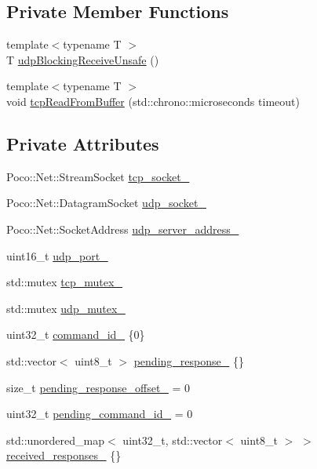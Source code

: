 \subsection*{Private Member Functions}
\begin{DoxyCompactItemize}
\item 
{\footnotesize template$<$typename T $>$ }\\T \hyperlink{classfranka_1_1Network_abe956fd11cd59309c93aebe15d433242}{udp\+Blocking\+Receive\+Unsafe} ()
\item 
{\footnotesize template$<$typename T $>$ }\\void \hyperlink{classfranka_1_1Network_a99a8575b86f0b4ddc206b67483cd65aa}{tcp\+Read\+From\+Buffer} (std\+::chrono\+::microseconds timeout)
\end{DoxyCompactItemize}
\subsection*{Private Attributes}
\begin{DoxyCompactItemize}
\item 
Poco\+::\+Net\+::\+Stream\+Socket \hyperlink{classfranka_1_1Network_a2c26c04f9ccb9792074799b101ee53e9}{tcp\+\_\+socket\+\_\+}
\item 
Poco\+::\+Net\+::\+Datagram\+Socket \hyperlink{classfranka_1_1Network_ac09fea0946977e7c366ad4a3421ef621}{udp\+\_\+socket\+\_\+}
\item 
Poco\+::\+Net\+::\+Socket\+Address \hyperlink{classfranka_1_1Network_a5c87db65f0818d727b797e7da8d71334}{udp\+\_\+server\+\_\+address\+\_\+}
\item 
uint16\+\_\+t \hyperlink{classfranka_1_1Network_a8bbe2dd022044033dbb2818db1a0e76b}{udp\+\_\+port\+\_\+}
\item 
std\+::mutex \hyperlink{classfranka_1_1Network_a8649d1cc6577ba09f7444c298905a11d}{tcp\+\_\+mutex\+\_\+}
\item 
std\+::mutex \hyperlink{classfranka_1_1Network_ab22bfa46c27a565336d6231971b019be}{udp\+\_\+mutex\+\_\+}
\item 
uint32\+\_\+t \hyperlink{classfranka_1_1Network_a3c0593618dbdedb1edb9ef2ef9392f19}{command\+\_\+id\+\_\+} \{0\}
\item 
std\+::vector$<$ uint8\+\_\+t $>$ \hyperlink{classfranka_1_1Network_a745d141f621767ebd98662e1239ab039}{pending\+\_\+response\+\_\+} \{\}
\item 
size\+\_\+t \hyperlink{classfranka_1_1Network_a6b514fb4c63a98080b346ac85f717739}{pending\+\_\+response\+\_\+offset\+\_\+} = 0
\item 
uint32\+\_\+t \hyperlink{classfranka_1_1Network_a5164b5782401061ed04063da53c1e188}{pending\+\_\+command\+\_\+id\+\_\+} = 0
\item 
std\+::unordered\+\_\+map$<$ uint32\+\_\+t, std\+::vector$<$ uint8\+\_\+t $>$ $>$ \hyperlink{classfranka_1_1Network_a99270a962346224117a68e309a01e054}{received\+\_\+responses\+\_\+} \{\}
\end{DoxyCompactItemize}


